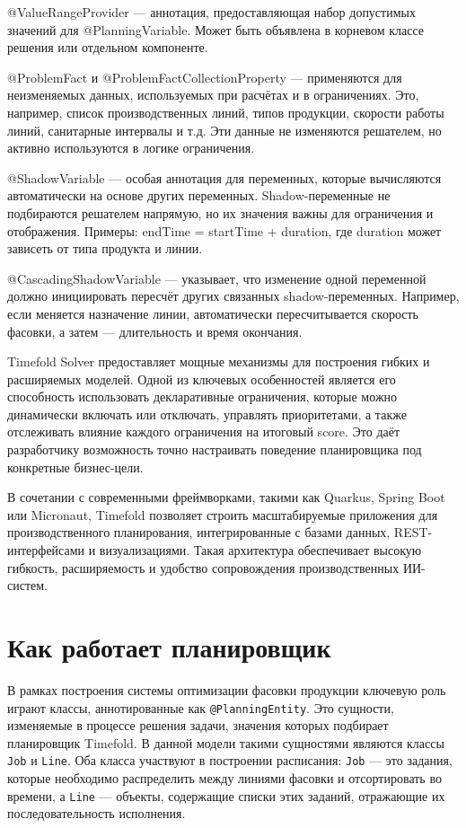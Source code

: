 @ValueRangeProvider — аннотация, предоставляющая набор допустимых значений для @PlanningVariable. Может быть объявлена в корневом классе решения или отдельном компоненте.

@ProblemFact и @ProblemFactCollectionProperty — применяются для неизменяемых данных, используемых при расчётах и в ограничениях. Это, например, список производственных линий, типов продукции, скорости работы линий, санитарные интервалы и т.д. Эти данные не изменяются решателем, но активно используются в логике ограничения.

@ShadowVariable — особая аннотация для переменных, которые вычисляются автоматически на основе других переменных. Shadow-переменные не подбираются решателем напрямую, но их значения важны для ограничения и отображения. Примеры: endTime = startTime + duration, где duration может зависеть от типа продукта и линии.

@CascadingShadowVariable — указывает, что изменение одной переменной должно инициировать пересчёт других связанных shadow-переменных. Например, если меняется назначение линии, автоматически пересчитывается скорость фасовки, а затем — длительность и время окончания.

Timefold Solver предоставляет мощные механизмы для построения гибких и расширяемых моделей. Одной из ключевых особенностей является его способность использовать декларативные ограничения, которые можно динамически включать или отключать, управлять приоритетами, а также отслеживать влияние каждого ограничения на итоговый score. Это даёт разработчику возможность точно настраивать поведение планировщика под конкретные бизнес-цели.

В сочетании с современными фреймворками, такими как Quarkus, Spring Boot или Micronaut, Timefold позволяет строить масштабируемые приложения для производственного планирования, интегрированные с базами данных, REST-интерфейсами и визуализациями. Такая архитектура обеспечивает высокую гибкость, расширяемость и удобство сопровождения производственных ИИ-систем.

\section{Как работает планировщик}

В рамках построения системы оптимизации фасовки продукции ключевую роль играют классы, аннотированные как \texttt{@PlanningEntity}. Это сущности, изменяемые в процессе решения задачи, значения которых подбирает планировщик Timefold. В данной модели такими сущностями являются классы \texttt{Job} и \texttt{Line}. Оба класса участвуют в построении расписания: \texttt{Job} — это задания, которые необходимо распределить между линиями фасовки и отсортировать во времени, а \texttt{Line} — объекты, содержащие списки этих заданий, отражающие их последовательность исполнения.

